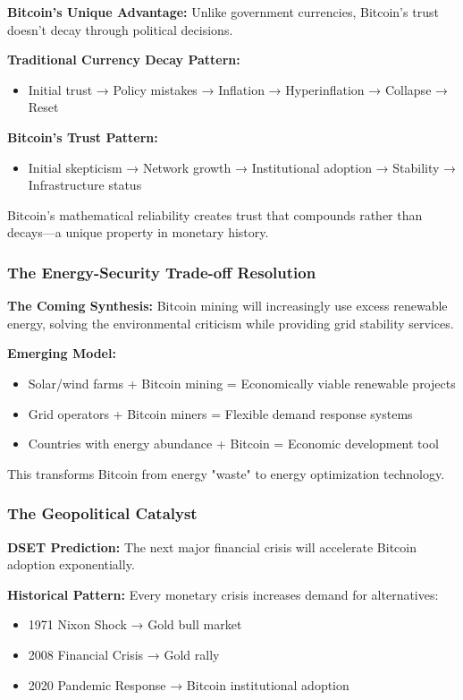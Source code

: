 \documentclass[11pt,oneside]{book}
\begin{document}
{{{{{{\textbf{Bitcoin's Unique Advantage:} Unlike government currencies, Bitcoin's trust doesn't decay through political decisions.

\textbf{Traditional Currency Decay Pattern:}
\begin{itemize}
\item Initial trust → Policy mistakes → Inflation → Hyperinflation → Collapse → Reset
\end{itemize}

\textbf{Bitcoin's Trust Pattern:}
\begin{itemize}
\item Initial skepticism → Network growth → Institutional adoption → Stability → Infrastructure status
\end{itemize}

Bitcoin's mathematical reliability creates trust that compounds rather than decays—a unique property in monetary history.

\subsubsection{The Energy-Security Trade-off Resolution}

\textbf{The Coming Synthesis:} Bitcoin mining will increasingly use excess renewable energy, solving the environmental criticism while providing grid stability services.

\textbf{Emerging Model:}
\begin{itemize}
\item Solar/wind farms + Bitcoin mining = Economically viable renewable projects
\item Grid operators + Bitcoin miners = Flexible demand response systems
\item Countries with energy abundance + Bitcoin = Economic development tool
\end{itemize}

This transforms Bitcoin from energy "waste" to energy optimization technology.

\subsubsection{The Geopolitical Catalyst}

\textbf{DSET Prediction:} The next major financial crisis will accelerate Bitcoin adoption exponentially.

\textbf{Historical Pattern:} Every monetary crisis increases demand for alternatives:
\begin{itemize}
\item 1971 Nixon Shock → Gold bull market
\item 2008 Financial Crisis → Gold rally
\item 2020 Pandemic Response → Bitcoin institutional adoption
\end{itemize}

}}}}}}
\end{document}
